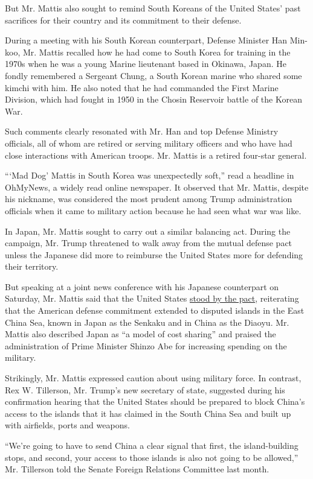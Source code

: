 But Mr. Mattis also sought to remind South Koreans of the United States'
past sacrifices for their country and its commitment to their defense.

During a meeting with his South Korean counterpart, Defense Minister Han
Min-koo, Mr. Mattis recalled how he had come to South Korea for training
in the 1970s when he was a young Marine lieutenant based in Okinawa,
Japan. He fondly remembered a Sergeant Chung, a South Korean marine who
shared some kimchi with him. He also noted that he had commanded the
First Marine Division, which had fought in 1950 in the Chosin Reservoir
battle of the Korean War.

Such comments clearly resonated with Mr. Han and top Defense Ministry
officials, all of whom are retired or serving military officers and who
have had close interactions with American troops. Mr. Mattis is a
retired four-star general.

```Mad Dog' Mattis in South Korea was unexpectedly soft,'' read a
headline in OhMyNews, a widely read online newspaper. It observed that
Mr. Mattis, despite his nickname, was considered the most prudent among
Trump administration officials when it came to military action because
he had seen what war was like.

In Japan, Mr. Mattis sought to carry out a similar balancing act. During
the campaign, Mr. Trump threatened to walk away from the mutual defense
pact unless the Japanese did more to reimburse the United States more
for defending their territory.

But speaking at a joint news conference with his Japanese counterpart on
Saturday, Mr. Mattis said that the United States
\href{https://www.nytimes.com/2017/02/03/world/asia/us-japan-mattis-abe-defense.html}{stood
by the pact}, reiterating that the American defense commitment extended
to disputed islands in the East China Sea, known in Japan as the Senkaku
and in China as the Diaoyu. Mr. Mattis also described Japan as ``a model
of cost sharing'' and praised the administration of Prime Minister
Shinzo Abe for increasing spending on the military.

Strikingly, Mr. Mattis expressed caution about using military force. In
contrast, Rex W. Tillerson, Mr. Trump's new secretary of state,
suggested during his confirmation hearing that the United States should
be prepared to block China's access to the islands that it has claimed
in the South China Sea and built up with airfields, ports and weapons.

``We're going to have to send China a clear signal that first, the
island-building stops, and second, your access to those islands is also
not going to be allowed,'' Mr. Tillerson told the Senate Foreign
Relations Committee last month.

